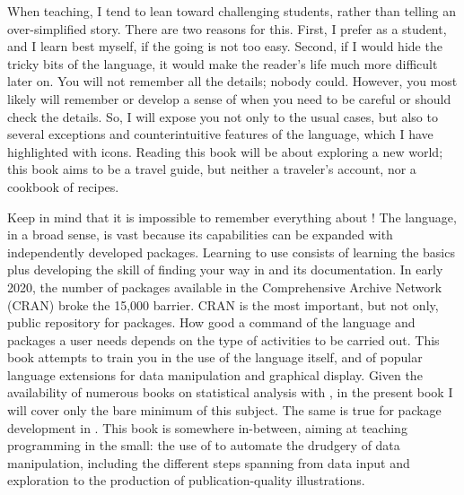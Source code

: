 When teaching, I tend to lean toward challenging students, rather than telling an over-simplified story. There are two reasons for this. First, I prefer as a student, and I learn best myself, if the going is not too easy. Second, if I would hide the tricky bits of the \Rlang language, it would make the reader's life much more difficult later on. You will not remember all the details; nobody could. However, you most likely will remember or develop a sense of when you need to be careful or should check the details. So, I will expose you not only to the usual cases, but also to several exceptions and counterintuitive features of the language, which I have highlighted with icons. Reading this book will be about exploring a new world; this book aims to be a travel guide, but neither a traveler's account, nor a cookbook of \Rlang recipes.

Keep in mind that it is impossible to remember everything about \Rlang! The \Rlang language, in a broad sense, is vast because its capabilities can be expanded with independently developed packages. Learning to use \Rlang consists of learning the basics plus developing the skill of finding your way in \Rlang and its documentation.  In early 2020, the number of packages available in the Comprehensive \Rlang Archive Network (CRAN) broke the 15,000 barrier. CRAN is the most important, but not only, public repository for \Rlang packages. How good a command of the \Rlang language and packages a user needs depends on the type of activities to be carried out. This book attempts to train you in the use of the \Rlang language itself, and of popular \Rlang language extensions for data manipulation and graphical display. Given the availability of numerous books on statistical analysis with \Rlang, in the present book I will cover only the bare minimum of this subject. The same is true for package development in \Rlang. This book is somewhere in-between, aiming at teaching programming in the small: the use of \Rlang to automate the drudgery of data manipulation, including the different steps spanning from data input and exploration to the production of publication-quality illustrations.

